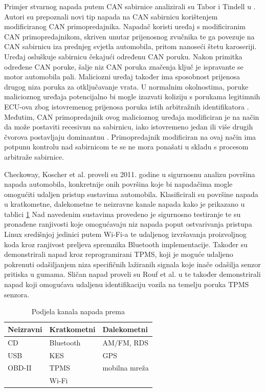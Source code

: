 \documentclass[times, utf8, diplomski, numeric]{fer}
\begin{document}
Primjer stvarnog napada putem CAN sabirnice analizirali su Tabor i Tindell u \cite{tindell2023injection}. Autori su prepoznali novi tip napada na CAN sabirnicu korištenjem modificiranog CAN primopredajnika. Napadač koristi uređaj s modificiranim CAN primopredajnikom, skriven unutar prijenosnog zvučnika te ga povezuje na CAN sabirnicu iza prednjeg svjetla automobila, pritom nanoseći štetu karoseriji. Uređaj osluškuje sabirnicu čekajući određenu CAN poruku. Nakon primitka određene CAN poruke, šalje niz CAN poruka značenja \glqq ključ je ispravan\grqq te se motor automobila pali. Maliciozni uređaj također ima sposobnost prijenosa drugog niza poruka za otključavanje vrata. U normalnim okolnostima, poruke malicioznog uređaja potencijalno bi mogle izazvati koliziju s porukama legitimnih ECU-ova zbog istovremenog prijenosa poruka istih arbitražnih identifikatora \cite{tindell2022can, tindell2023injection}. Međutim, CAN primopredajnik ovog malicioznog uređaja modificiran je na način da može postaviti recesivnu \grqq na sabirnicu, iako istovremeno jedan ili više drugih čvorova postavljaju dominantnu \grqq. Primopredajnik modificiran na ovaj način ima potpunu kontrolu nad sabirnicom te se ne mora ponašati u skladu s procesom arbitraže sabirnice.

Checkoway, Koscher et al. proveli su 2011. godine u \cite{checkoway2011comprehensive} sigurnosnu analizu površina napada automobila, konkretnije onih površina koje bi napadačima mogle omogućiti udaljen pristup sustavima automobila. Klasificirali su površine napada u kratkometne, dalekometne te neizravne kanale napada kako je prikazano u tablici \ref{tbl:checkoway} Nad navedenim sustavima provedeno je sigurnosno testiranje te su pronađene ranjivosti koje omogućavaju niz napada poput ostvarivanja pristupa Linux središnjoj jedinici putem Wi-Fi-a te udaljenog izvršavanja proizvoljnog koda kroz ranjivost preljeva spremnika Bluetooth implementacije. Također su demonstrirali napad kroz reprogramirani TPMS, koji je moguće udaljeno pokrenuti odašiljanjem niza specifičnih lažiranih signala koje inače odašilja senzor pritiska u gumama. Sličan napad proveli su Rouf et al. u \cite{rouf2010security} te također demonstrirali napad koji omogućava udaljenu identifikaciju vozila na temelju poruka TPMS senzora.

\begin{table}[htb]
\label{tbl:checkoway}
\centering
\begin{tabular}{@{}lll@{}}
\toprule
Neizravni & Kratkometni & Dalekometni   \\ \midrule
CD        & Bluetooth   & AM/FM, RDS    \\
USB       & KES         & GPS           \\
OBD-II    & TPMS        & mobilna mreža \\
          & Wi-Fi       &               \\ \bottomrule
\end{tabular}
\caption{Podjela kanala napada prema \cite{checkoway2011comprehensive}}
\end{table}
\end{document}
